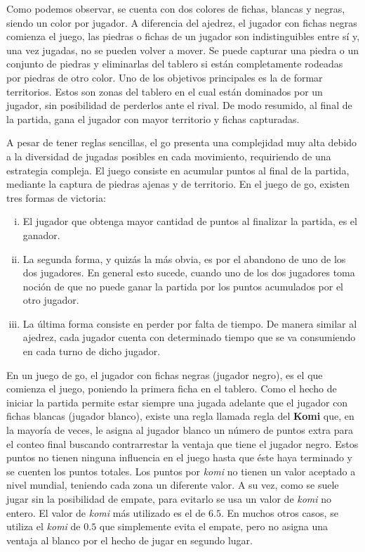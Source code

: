 \documentclass[11pt,twoside,spanish]{report} %
\begin{document}
Como podemos observar, se cuenta con dos colores de fichas, blancas y negras, siendo un color por jugador.
A diferencia del ajedrez, el jugador con fichas negras comienza el juego, las piedras o fichas de un jugador son indistinguibles entre s\'i y, una vez jugadas, no se pueden volver a mover.
Se puede capturar una piedra o un conjunto de piedras y eliminarlas del tablero si est\'an completamente rodeadas por piedras de otro color.
Uno de los objetivos principales es la de formar territorios.
Estos son zonas del tablero en el cual est\'an dominados por un jugador, sin posibilidad de perderlos ante el rival.
De modo resumido, al final de la partida, gana el jugador con mayor territorio y fichas capturadas.

A pesar de tener reglas sencillas, el go presenta una complejidad muy alta debido a la diversidad de jugadas posibles en cada movimiento, requiriendo de una estrategia compleja. %
El juego consiste en acumular puntos al final de la partida, mediante la captura de piedras ajenas y de territorio.
En el juego de go, existen tres formas de victoria:
\begin{enumerate}[i)]
\item El jugador que obtenga mayor cantidad de puntos al finalizar la partida, es el ganador.
\item La segunda forma, y quiz\'as la m\'as obvia, es por el abandono de uno de los dos jugadores.
En general esto sucede, cuando uno de los dos jugadores toma noci\'on de que no puede ganar la partida por los puntos acumulados por el otro jugador.
\item La \'ultima forma consiste en perder por falta de tiempo. De manera similar al ajedrez, cada jugador cuenta con determinado tiempo que se va consumiendo en cada turno de dicho jugador.
\end{enumerate}

En un juego de go, el jugador con fichas negras (jugador negro), es el que comienza el juego, poniendo la primera ficha en el tablero.
Como el hecho de iniciar la partida permite estar siempre una jugada adelante que el jugador con fichas blancas (jugador blanco), existe una regla llamada regla del \textbf{Komi} que, en la mayor\'ia de veces, le asigna al jugador blanco un n\'umero de puntos extra para el conteo final buscando contrarrestar la ventaja que tiene el jugador negro.
Estos puntos no tienen ninguna influencia en el juego hasta que \'este haya terminado y se cuenten los puntos totales.
Los puntos por \emph{komi} no tienen un valor aceptado a nivel mundial, teniendo cada zona un diferente valor.
A su vez, como se suele jugar sin la posibilidad de empate, para evitarlo se usa un valor de \emph{komi} no entero.
El valor de \emph{komi} m\'as utilizado es el de $6.5$.
En muchos otros casos, se utiliza el \emph{komi} de $0.5$ que simplemente evita el empate, pero no asigna una ventaja al blanco por el hecho de jugar en segundo lugar.
\end{document}
